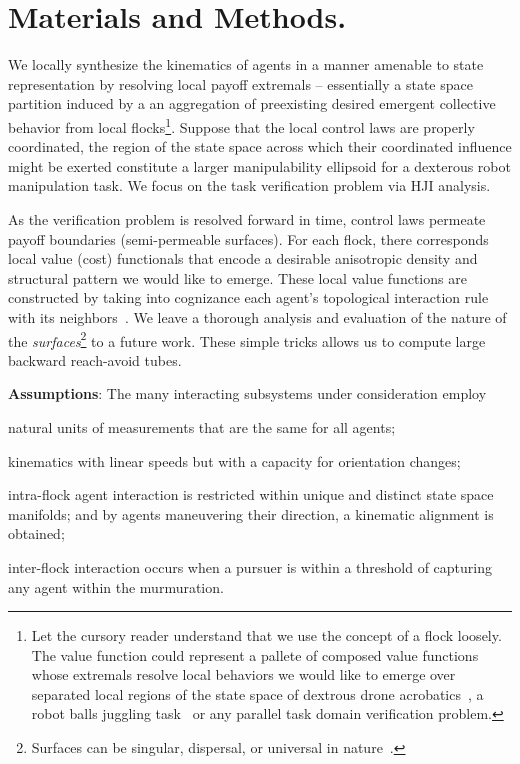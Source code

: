 \section{Materials and Methods.}
\label{sec:methods}
%

We locally synthesize the kinematics of agents in a manner amenable to state representation by resolving local payoff extremals -- essentially a state space partition induced by a an aggregation of preexisting desired emergent collective behavior from local flocks\footnote{Let the cursory reader understand that we use the concept of a flock loosely. The value function could represent a pallete of composed value functions whose extremals resolve local behaviors we would like to emerge over separated local regions of the state space of dextrous drone acrobatics~\cite{DeepAcrobatics}, a robot balls juggling task~\cite{SeqCompKoditschek} or any parallel task domain verification problem.}.  Suppose that the local control laws are properly coordinated, the region of the state space across which their coordinated influence might be exerted constitute a larger \eg manipulability ellipsoid for a dexterous robot manipulation task. We focus on the task verification problem via HJI analysis.
 
 As the verification problem is resolved forward in time, control laws permeate payoff boundaries (semi-permeable surfaces). For each flock, there corresponds local value (cost) functionals that encode a desirable anisotropic density and structural pattern we would like to emerge.  These local value functions are constructed by  taking into cognizance each agent's topological interaction rule with its neighbors~\cite{Ballerini1232}. We leave a thorough analysis and evaluation of the nature of the \textit{surfaces}\footnote{Surfaces can be  singular, dispersal, or universal in nature~\cite{Isaacs1965}.} to a future work. These simple tricks allows us to compute large backward reach-avoid tubes.%
 
 \noindent \textbf{Assumptions}:
The many interacting subsystems under consideration employ
 \begin{inparaenum}[(i)]
 	\item natural units of measurements that are the same for all agents; 
 	\item kinematics with linear speeds but with a capacity for orientation changes;
 	\item intra-flock agent interaction is restricted within unique and distinct state space manifolds; and by agents maneuvering their direction, a kinematic alignment is obtained;
 	\item inter-flock interaction occurs when a pursuer is within a threshold of capturing any agent within the murmuration.
 \end{inparaenum} 


